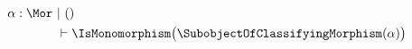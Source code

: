 \begin{sequent}
\begin{align*}
  \alpha:\Mor ~&|~ () \\
  &\vdash \IsMonomorphism\big( \SubobjectOfClassifyingMorphism( \alpha ) \big)
\end{align*}
\end{sequent}
